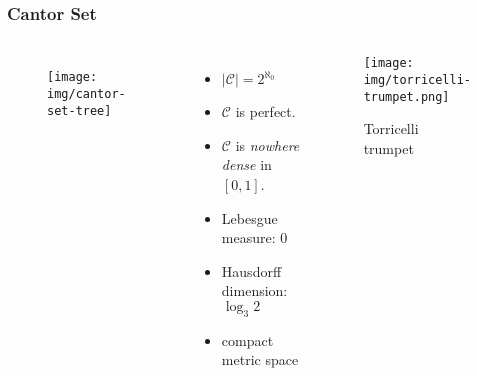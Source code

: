 \documentclass[UTF8,aspectratio=43,11pt,colorlinks,compress,openany]{beamer}%
\begin{document}
\begin{frame}\frametitle{Cantor Set}\vspace{-2ex}
	\begin{columns}
			\begin{figure}
				\texttt{[image: img/cantor-set-tree]}
			\end{figure}
			\vspace{-12pt}
			\begin{itemize}
				\item $|\mathcal{C}|=2^{\aleph_0}$
				\item $\mathcal{C}$ is perfect.
				\item $\mathcal{C}$ is \emph{nowhere dense} in $[0,1]$.
				\item Lebesgue measure: $0$
				\item Hausdorff dimension: $\log_3 2$
				\item compact metric space
			\end{itemize}
			\begin{center}
				\begin{figure}
					\texttt{[image: img/torricelli-trumpet.png]}\vspace{-4ex}\caption{Torricelli trumpet}
				\end{figure}
			\end{center}
	\end{columns}
\end{frame}
\end{document}
